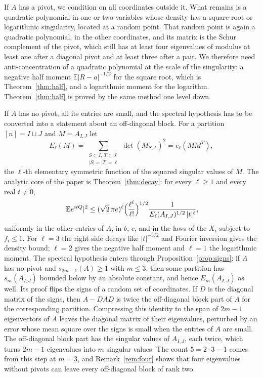 \documentclass[11pt]{amsart}
\numberwithin{equation}{section}
\theoremstyle{definition}
\theoremstyle{remark}
\newcommand{\E}{\mathbb E}
\newcommand{\1}{\mathbf 1}
\newcommand{\abs}[1]{\lvert #1\rvert}
\begin{document}
If $A$ has a pivot, we condition on all coordinates outside it. What remains is a quadratic polynomial in one or two variables whose density has a square-root or logarithmic singularity, located at a random point. That random point is again a quadratic polynomial, in the other coordinates, and its matrix is the Schur complement of the pivot, which still has at least four eigenvalues of modulus at least one after a diagonal pivot and at least three after a pair. We therefore need anti-concentration of a quadratic polynomial at the scale of the singularity: a negative half moment $\E\abs{R-a}^{-1/2}$ for the square root, which is Theorem~\ref{thm:half}, and a logarithmic moment for the logarithm. Theorem~\ref{thm:half} is proved by the same method one level down.

If $A$ has no pivot, all its entries are small, and the spectral hypothesis has to be converted into a statement about an off-diagonal block. For a partition $[n]=I\sqcup J$ and $M=A_{I,J}$ let
\[
E_\ell(M)=\sum_{\substack{S\subset I,\ T\subset J\\ \abs S=\abs T=\ell}}\det(M_{S,T})^2=e_\ell(MM^T),
\]
the $\ell$-th elementary symmetric function of the squared singular values of $M$. The analytic core of the paper is Theorem~\ref{thm:decay}: for every $\ell\ge1$ and every real $t\ne0$,
\[
\abs{\E e^{itQ}}^2\le(\sqrt2\,\pi e)^\ell\Bigl(\frac{\ell^\ell}{\ell!}\Bigr)^{1/2}\frac{1}{E_\ell(A_{I,J})^{1/2}\,\abs t^{\ell}},
\]
uniformly in the other entries of $A$, in $b$, $c$, and in the laws of the $X_i$ subject to $f_i\le1$. For $\ell=3$ the right side decays like $\abs t^{-3/2}$ and Fourier inversion gives the density bound; $\ell=2$ gives the negative half moment and $\ell=1$ the logarithmic moment. The spectral hypothesis enters through Proposition~\ref{prop:signs}: if $A$ has no pivot and $s_{2m-1}(A)\ge1$ with $m\le3$, then some partition has $s_m(A_{I,J})$ bounded below by an absolute constant, and hence $E_m(A_{I,J})$ as well. Its proof flips the signs of a random set of coordinates. If $D$ is the diagonal matrix of the signs, then $A-DAD$ is twice the off-diagonal block part of $A$ for the corresponding partition. Compressing this identity to the span of $2m-1$ eigenvectors of $A$ leaves the diagonal matrix of their eigenvalues, perturbed by an error whose mean square over the signs is small when the entries of $A$ are small. The off-diagonal block part has the singular values of $A_{I,J}$, each twice, which turns $2m-1$ eigenvalues into $m$ singular values. The count $5=2\cdot3-1$ comes from this step at $m=3$, and Remark~\ref{rem:four} shows that four eigenvalues without pivots can leave every off-diagonal block of rank two.
\end{document}
